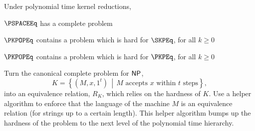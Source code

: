\newcommand{\indentitem}{\setlength\itemindent{1cm}}
\begin{theorem}
  Under polynomial time kernel reductions,
  \begin{enumerate}
  {\indentitem \item $\PSPACEEq$ has a complete problem}
  {\indentitem \item $\PKPOPEq$ contains a problem which is hard for $\SKPEq$, for all $k\geq 0$}
  {\indentitem \item $\PKPOPEq$ contains a problem which is hard for $\PKPEq$, for all $k\geq 0$}
  \end{enumerate}
\end{theorem}

\begin{proofidea}
  Turn the canonical complete problem for ${\mathsf{NP}}$,
  \begin{displaymath}
    K = \left\{(M, x, 1^t)\,\middle|\,M\text{ accepts } x \text{ within } t \text{ steps}\right\},
  \end{displaymath}
  into an equivalence relation, $R_K$, which relies on the hardness of $K$.
  Use a helper algorithm to enforce that the language of the machine $M$ is an equivalence relation (for strings up to a certain length).
  This helper algorithm bumps up the hardness of the problem to the next level of the polynomial time hierarchy.
\end{proofidea}
